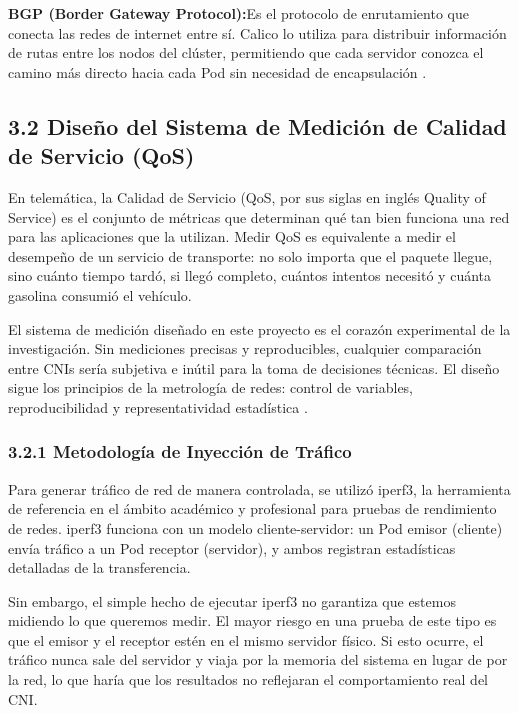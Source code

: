 \documentclass[journal]{IEEEtran}
\begin{document}
\textbf{BGP (Border Gateway Protocol):}Es el protocolo de enrutamiento que conecta las redes de internet entre sí. Calico lo utiliza para distribuir información de rutas entre los nodos del clúster, permitiendo que cada servidor conozca el camino más directo hacia cada Pod sin necesidad de encapsulación \cite{ref2}.

\subsection{3.2 Diseño del Sistema de Medición de Calidad de Servicio (QoS)}

En telemática, la Calidad de Servicio (QoS, por sus siglas en inglés Quality of Service) es el conjunto de métricas que determinan qué tan bien funciona una red para las aplicaciones que la utilizan. Medir QoS es equivalente a medir el desempeño de un servicio de transporte: no solo importa que el paquete llegue, sino cuánto tiempo tardó, si llegó completo, cuántos intentos necesitó y cuánta gasolina consumió el vehículo.

El sistema de medición diseñado en este proyecto es el corazón experimental de la investigación. Sin mediciones precisas y reproducibles, cualquier comparación entre CNIs sería subjetiva e inútil para la toma de decisiones técnicas. El diseño sigue los principios de la metrología de redes: control de variables, reproducibilidad y representatividad estadística \cite{ref6}.

\subsubsection{3.2.1 Metodología de Inyección de Tráfico}

Para generar tráfico de red de manera controlada, se utilizó iperf3, la herramienta de referencia en el ámbito académico y profesional para pruebas de rendimiento de redes. iperf3 funciona con un modelo cliente-servidor: un Pod emisor (cliente) envía tráfico a un Pod receptor (servidor), y ambos registran estadísticas detalladas de la transferencia.

Sin embargo, el simple hecho de ejecutar iperf3 no garantiza que estemos midiendo lo que queremos medir. El mayor riesgo en una prueba de este tipo es que el emisor y el receptor estén en el mismo servidor físico. Si esto ocurre, el tráfico nunca sale del servidor y viaja por la memoria del sistema en lugar de por la red, lo que haría que los resultados no reflejaran el comportamiento real del CNI.
\end{document}
